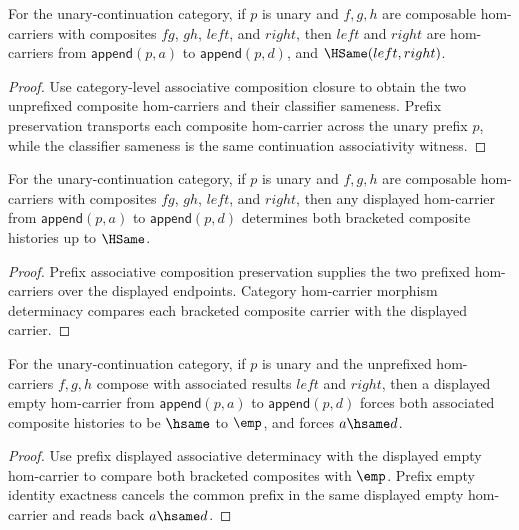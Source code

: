 \begin{theorem}
\label{thm:functor-prefix-hom-carrier-comp-assoc-preserves}
For the unary-continuation category, if \(p\) is unary and \(f,g,h\) are
composable hom-carriers with composites \(fg\), \(gh\), \(left\), and
\(right\), then \(left\) and \(right\) are hom-carriers from
\(\mathsf{append}(p,a)\) to \(\mathsf{append}(p,d)\), and
\(\HSame(left,right)\).
\end{theorem}
\begin{proof}
Use category-level associative composition closure to obtain the two
unprefixed composite hom-carriers and their classifier sameness. Prefix
preservation transports each composite hom-carrier across the unary prefix
\(p\), while the classifier sameness is the same continuation associativity
witness.
\end{proof}

\begin{theorem}
\label{thm:functor-prefix-hom-carrier-comp-assoc-displayed-deterministic}
For the unary-continuation category, if $p$ is unary and $f,g,h$ are
composable hom-carriers with composites $fg$, $gh$, $left$, and $right$, then
any displayed hom-carrier from $\mathsf{append}(p,a)$ to
$\mathsf{append}(p,d)$ determines both bracketed composite histories up to
$\HSame$.
\end{theorem}
\begin{proof}
Prefix associative composition preservation supplies the two prefixed
hom-carriers over the displayed endpoints. Category hom-carrier morphism
determinacy compares each bracketed composite carrier with the displayed
carrier.
\end{proof}

\begin{theorem}
\label{thm:functor-prefix-hom-carrier-comp-assoc-empty-result-components}
For the unary-continuation category, if \(p\) is unary and the unprefixed
hom-carriers \(f,g,h\) compose with associated results \(left\) and \(right\),
then a displayed empty hom-carrier from \(\mathsf{append}(p,a)\) to
\(\mathsf{append}(p,d)\) forces both associated composite histories to be
\(\hsame\) to \(\emp\), and forces \(a\hsame d\).
\end{theorem}
\begin{proof}
Use prefix displayed associative determinacy with the displayed empty
hom-carrier to compare both bracketed composites with \(\emp\). Prefix empty
identity exactness cancels the common prefix in the same displayed empty
hom-carrier and reads back \(a\hsame d\).
\end{proof}

